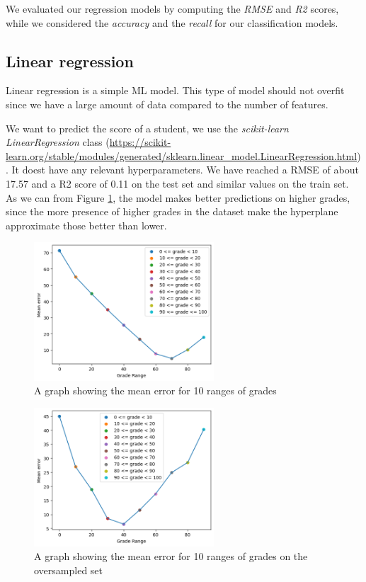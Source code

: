 \documentclass{article}
\begin{document}
We evaluated our regression models by computing the \textit{RMSE} and \textit{R2} scores, while we considered the \textit{accuracy} and the \textit{recall} for our classification models.

\subsection{Linear regression}
\FloatBarrier
Linear regression is a simple ML model. This type of model should not overfit since we have a large amount of data compared to the number of features.

We want to predict the score of a student, we use the \textit{scikit-learn LinearRegression} class (\url{https://scikit-learn.org/stable/modules/generated/sklearn.linear_model.LinearRegression.html}). It doest have any relevant hyperparameters.
We have reached a RMSE of about 17.57 and a R2 score of 0.11 on the test set and similar values on the train set.
As we can from Figure \ref{fig:errorGraph}, the model makes better predictions on higher grades, since the more presence of higher grades in the dataset make the hyperplane approximate those better than lower. 
\begin{figure}[h!]
    \centering
    \includegraphics[width=0.6\textwidth]{grades_errors.png}
    \caption{A graph showing the mean error for 10 ranges of grades}
    \label{fig:errorGraph}
\end{figure}

\begin{figure}[h!]
    \centering
    \includegraphics[width=0.6\textwidth]{grades_errors2.png}
    \caption{A graph showing the mean error for 10 ranges of grades on the oversampled set}
    \label{fig:errorGraph2}
\end{figure}
\newpage
\end{document}
